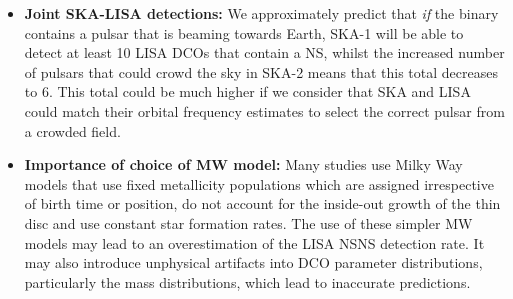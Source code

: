 \begin{itemize}
    \item \textbf{Joint SKA-LISA detections:} We approximately predict that \textit{if} the binary contains a pulsar that is beaming towards Earth, SKA-1 will be able to detect at least 10 LISA DCOs that contain a NS, whilst the increased number of pulsars that could crowd the sky in SKA-2 means that this total decreases to 6. This total could be much higher if we consider that SKA and LISA could match their orbital frequency estimates to select the correct pulsar from a crowded field.
    \item \textbf{Importance of choice of MW model:} Many studies use Milky Way models that use fixed metallicity populations which are assigned irrespective of birth time or position, do not account for the inside-out growth of the thin disc and use constant star formation rates. The use of these simpler MW models may lead to an overestimation of the LISA NSNS detection rate. It may also introduce unphysical artifacts into DCO parameter distributions, particularly the mass distributions, which lead to inaccurate predictions.
\end{itemize}